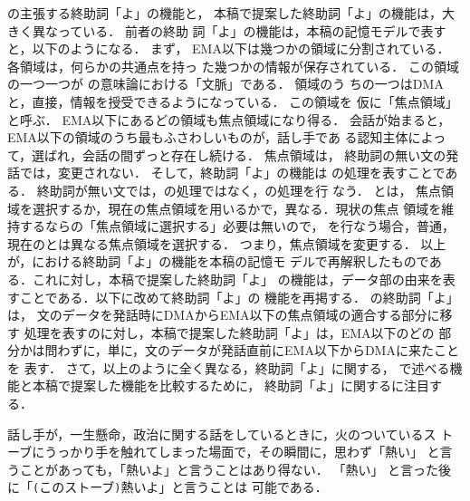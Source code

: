 \cite{kinsui93,kinsui93-3}の主張する終助詞「よ」の機能と，
本稿で提案した終助詞「よ」の機能は，大きく異なっている．  前者の終助
詞「よ」の機能は，本稿の記憶モデルで表すと，以下のようになる．  まず，
EMA以下は幾つかの領域に分割されている．  各領域は，何らかの共通点を持っ
た幾つかの情報が保存されている．  この領域の一つ一つが
\cite{kinsui93,kinsui93-3}の意味論における「文脈」である．  領域のう
ちの一つはDMAと，直接，情報を授受できるようになっている．  この領域を
仮に「焦点領域」と呼ぶ．  EMA以下にあるどの領域も焦点領域になり得る．
会話が始まると，EMA以下の領域のうち最もふさわしいものが，話し手であ
る認知主体によって，選ばれ，会話の間ずっと存在し続ける．  焦点領域は，
終助詞の無い文の発話では，変更されない．  そして，終助詞「よ」の機能は
の処理を表すことである．
終助詞が無い文では，の処理ではなく，の処理を行
なう．
とは，
焦点領域を選択するか，現在の焦点領域を用いるかで，異なる．現状の焦点
領域を維持するならの「焦点領域に選択する」必要は無いので，
を行なう場合，普通，現在のとは異なる焦点領域を選択する．
つまり，焦点領域を変更する．
以上が，\cite{kinsui93,kinsui93-3}における終助詞「よ」の機能を本稿の記憶モ
デルで再解釈したものである．これに対し，本稿で提案した終助詞「よ」
の機能は，データ部の由来を表すことである．以下に改めて終助詞「よ」の
機能を再掲する．
\cite{kinsui93,kinsui93-3}の終助詞「よ」は，
文のデータを発話時にDMAからEMA以下の焦点領域の適合する部分に移す
処理を表すのに対し，本稿で提案した終助詞「よ」は，EMA以下のどの
部分かは問わずに，単に，文のデータが発話直前にEMA以下からDMAに来たことを
表す．
さて，以上のように全く異なる，終助詞「よ」に関する，
\cite{kinsui93,kinsui93-3}で述べる機能と本稿で提案した機能を比較するために，
終助詞「よ」に関するに注目する．
\begin{obserb}  \label{atui}
話し手が，一生懸命，政治に関する話をしているときに，火のついているス
トーブにうっかり手を触れてしまった場面で，その瞬間に，思わず「熱い」
と言うことがあっても，「熱い{\dg よ}」と言うことはあり得ない．  「熱い」
と言った後に「\verb+(+このストーブ\verb+)+熱い{\dg よ}」と言うことは
可能である．
\end{obserb}
